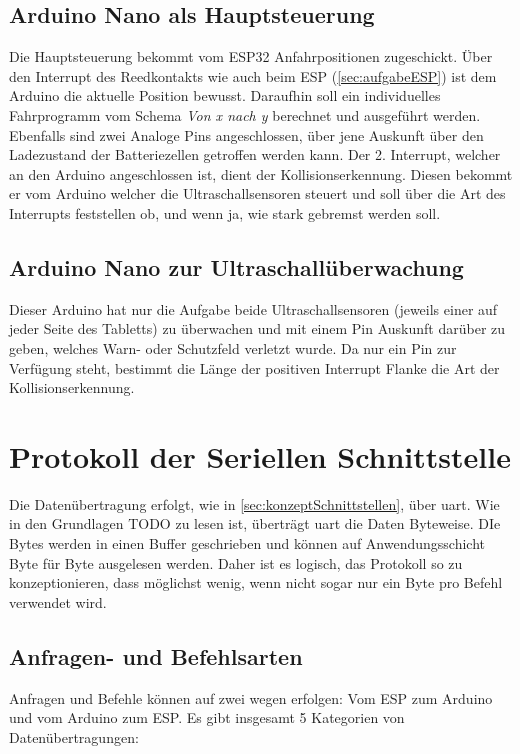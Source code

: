 \subsection{Arduino Nano als Hauptsteuerung}
\label{sec:aufgabeArduinoNanoMotor}
Die Hauptsteuerung bekommt vom ESP32 Anfahrpositionen zugeschickt. Über den Interrupt des Reedkontakts wie auch beim ESP (\autoref{sec:aufgabeESP}) ist dem Arduino die aktuelle Position bewusst. Daraufhin soll ein individuelles Fahrprogramm vom Schema \textit{Von x nach y} berechnet und ausgeführt werden. Ebenfalls sind zwei Analoge Pins angeschlossen, über jene Auskunft über den Ladezustand der Batteriezellen getroffen werden kann. Der 2. Interrupt, welcher an den Arduino angeschlossen ist, dient der Kollisionserkennung. Diesen bekommt er vom Arduino welcher die Ultraschallsensoren steuert und soll über die Art des Interrupts feststellen ob, und wenn ja, wie stark gebremst werden soll.

\subsection{Arduino Nano zur Ultraschallüberwachung}
\label{sec:aufgabeArduinoNanoUltraschall}
Dieser Arduino hat nur die Aufgabe beide Ultraschallsensoren (jeweils einer auf jeder Seite des Tabletts) zu überwachen und mit einem Pin Auskunft darüber zu geben, welches Warn- oder Schutzfeld verletzt wurde. Da nur ein Pin zur Verfügung steht, bestimmt die Länge der positiven Interrupt Flanke die Art der Kollisionserkennung.

\section{Protokoll der Seriellen Schnittstelle}
Die Datenübertragung erfolgt, wie in \autoref{sec:konzeptSchnittstellen}, über \acrshort{uart}. Wie in den Grundlagen TODO zu lesen ist, überträgt \acrshort{uart} die Daten Byteweise. DIe Bytes werden in einen Buffer geschrieben und können auf Anwendungsschicht Byte für Byte ausgelesen werden. Daher ist es logisch, das Protokoll so zu konzeptionieren, dass möglichst wenig, wenn nicht sogar nur ein Byte pro Befehl verwendet wird. 

\subsection{Anfragen- und Befehlsarten}
Anfragen und Befehle können auf zwei wegen erfolgen: Vom ESP zum Arduino und vom Arduino zum ESP. Es gibt insgesamt 5 Kategorien von Datenübertragungen:

